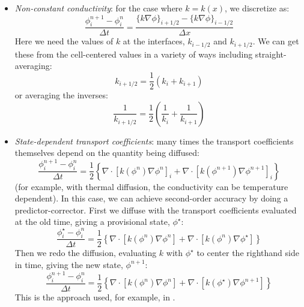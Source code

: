\begin{itemize}

\item {\em Non-constant conductivity}: for the case where $k = k(x)$,
  we discretize as:
  \begin{equation}
  \frac{\phi_i^{n+1} - \phi_i^n}{\Delta t} = 
        \frac{ \{ k \nabla \phi \}_{i+1/2} -
               \{ k \nabla \phi \}_{i-1/2}}{\Delta x}
  \end{equation}
 Here we need the values of $k$ at the interfaces, $k_{i-1/2}$ and
 $k_{i+1/2}$.  We can get these from the cell-centered values in a
 variety of ways including straight-averaging:
 \begin{equation}
 k_{i+1/2} = \frac{1}{2} (k_i + k_{i+1})
 \end{equation}
 or averaging the inverses:
 \begin{equation}
 \frac{1}{k_{i+1/2}} = \frac{1}{2} \left (\frac{1}{k_i} + \frac{1}{k_{i+1}} \right )
 \end{equation}
 
\item {\em State-dependent transport coefficients}: many times the
  transport coefficients themselves depend on the quantity being
  diffused:
  \begin{equation}
  \frac{\phi_i^{n+1} - \phi_i^n}{\Delta t} = 
        \frac{1}{2} \left \{
               \nabla \cdot [ k(\phi^n) \nabla \phi^n ]_i +
               \nabla \cdot [ k(\phi^{n+1}) \nabla \phi^{n+1} ]_i 
               \right \}
  \end{equation}
  (for example, with thermal diffusion, the conductivity can
  be temperature dependent).  In this case, we can achieve second-order
  accuracy by doing a predictor-corrector.  First we diffuse with
  the transport coefficients evaluated at the old time, giving a provisional
  state, $\phi^\star$:
  \begin{equation}
  \frac{\phi_i^\star - \phi_i^n}{\Delta t} = 
        \frac{1}{2} \left \{
               \nabla \cdot [ k(\phi^n) \nabla \phi^n ] +
               \nabla \cdot [ k(\phi^n) \nabla \phi^\star ] 
               \right \}
  \end{equation}
  Then we redo the diffusion, evaluating $k$ with $\phi^\star$ to
  center the righthand side in time, giving the new state, $\phi^{n+1}$:
  \begin{equation}
  \frac{\phi_i^{n+1} - \phi_i^n}{\Delta t} = 
        \frac{1}{2} \left \{
               \nabla \cdot [ k(\phi^n) \nabla \phi^n ] +
               \nabla \cdot [ k(\phi^\star) \nabla \phi^{n+1} ] 
               \right \}
  \end{equation}
  This is the approach used, for example, in \cite{SNpaper}.



\end{itemize}
